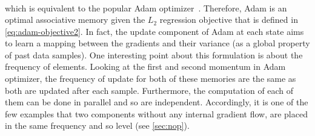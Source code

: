 \documentclass{article}
\newcommand{\citep}{\parencite}
\begin{document}
{\begin{align}
\end{align}
which is equivalent to the popular Adam optimizer~\citep{kingma2014adam}. Therefore, Adam is an optimal associative memory given the $L_2$ regression objective that is defined in \autoref{eq:adam-objective2}. In fact, the update component of Adam at each state aims to learn a mapping between the gradients and their variance (as a global property of past data samples). One interesting point about this formulation is about the frequency of elements. Looking at the first and second momentum in Adam optimizer, the frequency of update for both of these memories are the same as both are updated after each sample. Furthermore, the computation of each of them can be done in parallel and so are independent. Accordingly, it is one of the few examples that two components without any internal gradient flow, are placed in the same frequency and so level (see \autoref{sec:nop}).  

}
\end{document}
